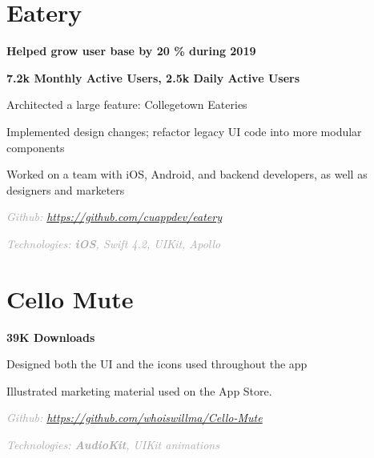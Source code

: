 \documentclass[]{deedy-resume-openfont}
\newcommand{\myurl}[1]{
	\urlstyle{same}\url{#1}
}
\let\sectionold\section
\renewcommand{\section}[1]{
	\sectionold{\textcolor{sectiontitlecolor}{#1}}
}
\begin{document}
\begin{minipage}[t]{0.66\textwidth}
\section{Eatery}
\begin{tightemize}
\item \textbf{Helped grow user base by 20 \% during 2019}
\item \textbf{7.2k Monthly Active Users, 2.5k Daily Active Users} 
\item Architected a large feature: Collegetown Eateries
\item Implemented design changes; refactor legacy UI code into more modular components
\item Worked on a team with iOS, Android, and backend developers, as well as designers and marketers
\\
\item \textcolor{darkgray}{\textit{Github: \myurl{https://github.com/cuappdev/eatery}}}  \\
\item \textcolor{darkgray}{\textit{Technologies: \textbf{iOS}, Swift 4.2, UIKit, Apollo}} 
\end{tightemize}

\section{Cello Mute}
\begin{tightemize}
\item \textbf{39K Downloads}
\item Designed both the UI and the icons used throughout the app
\item Illustrated marketing material used on the App Store.
\\
\item \textcolor{darkgray}{\textit{Github: \myurl{https://github.com/whoiswillma/Cello-Mute}}} 
\item \textcolor{darkgray}{\textit{Technologies: \textbf{AudioKit}, UIKit animations}} 
\end{tightemize}


\end{minipage}
\end{document}
